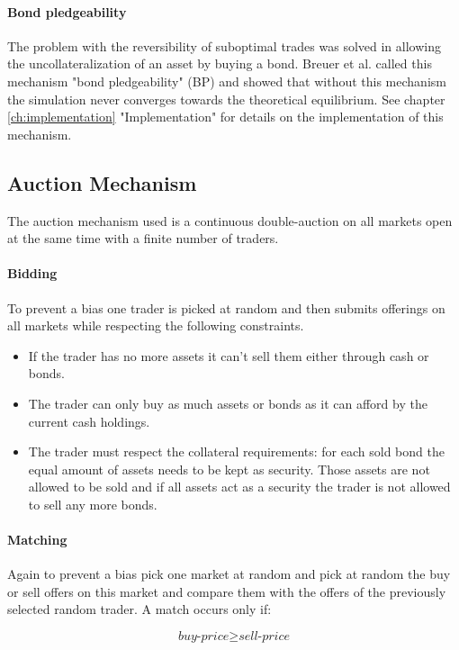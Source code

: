 \documentclass[../Bachelorarbeit.tex]{subfiles}
\begin{document}
\paragraph{Bond pledgeability}
The problem with the reversibility of suboptimal trades was solved in allowing the uncollateralization of an asset by buying a bond. Breuer et al. called this mechanism "bond pledgeability" (BP) and showed that without this mechanism the simulation never converges towards the theoretical equilibrium. See chapter \ref{ch:implementation} "Implementation" for details on the implementation of this mechanism.

\subsection{Auction Mechanism}
\label{sec:AUCTION_MECHANISM}
The auction mechanism used is a continuous double-auction on all markets open at the same time with a finite number of traders.

\paragraph{Bidding}
To prevent a bias one trader is picked at random and then submits offerings on all markets while respecting the following constraints.

\begin{itemize}
\item If the trader has no more assets it can't sell them either through cash or bonds.
\item The trader can only buy as much assets or bonds as it can afford by the current cash holdings.
\item The trader must respect the collateral requirements: for each sold bond the equal amount of assets needs to be kept as security. Those assets are not allowed to be sold and if all assets act as a security the trader is not allowed to sell any more bonds.
\end{itemize}

\paragraph{Matching}
Again to prevent a bias pick one market at random and pick at random the buy or sell offers on this market and compare them with the offers of the previously selected random trader. A match occurs only if:

\begin{equation}
\textit{buy-price} \geq \textit{sell-price}
\end{equation}
\end{document}
